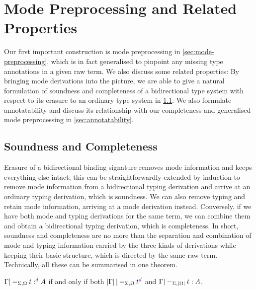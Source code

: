 
\section{Mode Preprocessing and Related Properties}\label{sec:pre-synthesis}

Our first important construction is mode preprocessing in \cref{sec:mode-preprocessing}, which is in fact generalised to pinpoint any missing type annotations in a given raw term.
We also discuss some related properties:
By bringing mode derivations into the picture, we are able to give a natural formulation of soundness and completeness of a bidirectional type system with respect to its erasure to an ordinary type system in \cref{sec:soundness-and-completeness}.
We also formulate  annotatability and discuss its relationship with our completeness and generalised mode preprocessing in \cref{sec:annotatability}.

\subsection{Soundness and Completeness}
\label{sec:soundness-and-completeness}


Erasure of a bidirectional binding signature removes mode information and keeps everything else intact; this can be straightforwardly extended by induction to remove mode information from a bidirectional typing derivation and arrive at an ordinary typing derivation, which is soundness.
We can also remove typing and retain mode information, arriving at a mode derivation instead.
Conversely, if we have both mode and typing derivations for the same term, we can combine them and obtain a bidirectional typing derivation, which is completeness.
In short, soundness and completeness are no more than the separation and combination of mode and typing information carried by the three kinds of derivations while keeping their basic structure, which is directed by the same raw term.
Technically, all these can be summarised in one theorem.

\begin{theorem}\label{lem:soundness-completeness}
$\Gamma |-_{\Sigma, \Omega} t :^\dir{d} A$ if and only if both\/ $\erase\Gamma |-_{\Sigma, \Omega} t^\dir{d}$ and\/ $\Gamma |-_{\Sigma, \left|\Omega\right|} t : A$.
\end{theorem}

